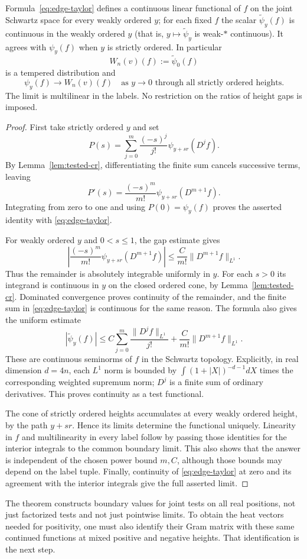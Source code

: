 \begin{theorem}\label{thm:joint-boundary}
Formula~\eqref{eq:edge-taylor} defines a continuous linear functional of $f$
on the joint Schwartz space for every weakly ordered $y$; for each fixed $f$
the scalar $\widetilde\psi_y(f)$ is continuous in the weakly ordered $y$
(that is, $y\mapsto\widetilde\psi_y$ is weak-$*$ continuous).
It agrees with $\psi_y(f)$ when $y$ is strictly ordered. In particular
\[
 W_n(v)(f):=\widetilde\psi_0(f)
\]
is a tempered distribution and
\[
 \psi_y(f)\longrightarrow W_n(v)(f)
 \quad\text{as }y\to0\text{ through all strictly ordered heights}.
\]
The limit is multilinear in the labels. No restriction on the ratios of
height gaps is imposed.
\end{theorem}
\begin{proof}
First take strictly ordered $y$ and set
\[
 P(s)=\sum_{j=0}^{m}\frac{(-s)^j}{j!}\psi_{y+sr}(D^jf).
\]
By Lemma~\ref{lem:tested-cr}, differentiating the finite sum cancels
successive terms, leaving
\[
 P'(s)=\frac{(-s)^m}{m!}\psi_{y+sr}(D^{m+1}f).
\]
Integrating from zero to one and using $P(0)=\psi_y(f)$ proves the asserted
identity with \eqref{eq:edge-taylor}.

For weakly ordered $y$ and $0<s\leq1$, the gap estimate gives
\[
 \left|\frac{(-s)^m}{m!}\psi_{y+sr}(D^{m+1}f)\right|
 \leq\frac{C}{m!}\|D^{m+1}f\|_{L^1}.
\]
Thus the remainder is absolutely integrable uniformly in $y$. For each
$s>0$ its integrand is continuous in $y$ on the closed ordered cone, by
Lemma~\ref{lem:tested-cr}. Dominated convergence proves continuity of the
remainder, and the finite sum in \eqref{eq:edge-taylor} is continuous for
the same reason. The formula also gives the uniform estimate
\[
 |\widetilde\psi_y(f)|\leq
 C\sum_{j=0}^{m}\frac{\|D^jf\|_{L^1}}{j!}
   +\frac{C}{m!}\|D^{m+1}f\|_{L^1}.
\]
These are continuous seminorms of $f$ in the Schwartz topology. Explicitly,
in real dimension $d=4n$, each $L^1$ norm is bounded by
$\int(1+|X|)^{-d-1}dX$ times the corresponding weighted supremum norm;
$D^j$ is a finite sum of ordinary derivatives. This proves continuity as a
test functional.

The cone of strictly ordered heights accumulates at every weakly ordered
height, by the path $y+sr$. Hence its limits determine the functional
uniquely. Linearity in $f$ and multilinearity in every label follow by
passing those identities for the interior integrals to the common boundary
limit. This also shows that the answer is independent of the chosen power
bound $m,C$, although those bounds may depend on the label tuple. Finally,
continuity of \eqref{eq:edge-taylor} at zero and its agreement with the
interior integrals give the full asserted limit.
\end{proof}

The theorem constructs boundary values for joint tests on all real positions,
not just factorized tests and not just pointwise limits. To obtain the heat
vectors needed for positivity, one must also identify their Gram matrix with
these same continued functions at mixed positive and negative heights. That
identification is the next step.
